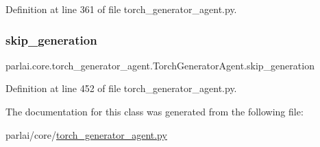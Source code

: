 Definition at line 361 of file torch\+\_\+generator\+\_\+agent.\+py.

\mbox{\label{classparlai_1_1core_1_1torch__generator__agent_1_1TorchGeneratorAgent_a713b4b7ae6d30a664c97c4ea121f8e38}} 
\subsubsection{\texorpdfstring{skip\+\_\+generation}{skip\_generation}}
{\footnotesize\ttfamily parlai.\+core.\+torch\+\_\+generator\+\_\+agent.\+Torch\+Generator\+Agent.\+skip\+\_\+generation}



Definition at line 452 of file torch\+\_\+generator\+\_\+agent.\+py.



The documentation for this class was generated from the following file\+:\begin{DoxyCompactItemize}
\item 
parlai/core/\hyperlink{torch__generator__agent_8py}{torch\+\_\+generator\+\_\+agent.\+py}\end{DoxyCompactItemize}
